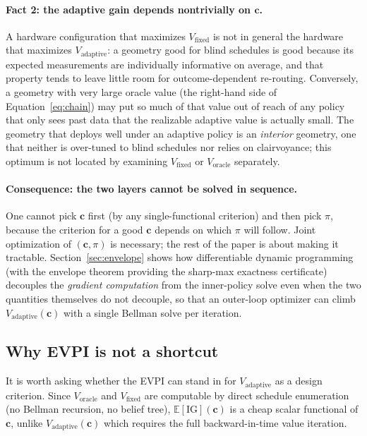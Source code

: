 \documentclass[11pt,a4paper,onecolumn]{article}
\newcommand{\E}{\mathbb{E}}
\newcommand{\bc}{\bm{c}}
\begin{document}
\paragraph{Fact 2: the adaptive gain depends nontrivially on $\bc$.}  A hardware configuration that maximizes $V_{\text{fixed}}$ is not in general the hardware that maximizes $V_{\text{adaptive}}$: a geometry good for blind schedules is good because its expected measurements are individually informative on average, and that property tends to leave little room for outcome-dependent re-routing.  Conversely, a geometry with very large oracle value (the right-hand side of Equation~\eqref{eq:chain}) may put so much of that value out of reach of any policy that only sees past data that the realizable adaptive value is actually small.  The geometry that deploys well under an adaptive policy is an \emph{interior} geometry, one that neither is over-tuned to blind schedules nor relies on clairvoyance; this optimum is not located by examining $V_{\text{fixed}}$ or $V_{\text{oracle}}$ separately.

\paragraph{Consequence: the two layers cannot be solved in sequence.}  One cannot pick $\bc$ first (by any single-functional criterion) and then pick $\pi$, because the criterion for a good $\bc$ depends on which $\pi$ will follow.  Joint optimization of $(\bc, \pi)$ is necessary; the rest of the paper is about making it tractable.  Section~\ref{sec:envelope} shows how differentiable dynamic programming (with the envelope theorem providing the sharp-max exactness certificate) decouples the \emph{gradient computation} from the inner-policy solve even when the two quantities themselves do not decouple, so that an outer-loop optimizer can climb $V_{\text{adaptive}}(\bc)$ with a single Bellman solve per iteration.

\subsection{Why EVPI is not a shortcut}
\label{sec:evpi_shortcut}

It is worth asking whether the EVPI can stand in for $V_{\text{adaptive}}$ as a design criterion.  Since $V_{\text{oracle}}$ and $V_{\text{fixed}}$ are computable by direct schedule enumeration (no Bellman recursion, no belief tree), $\E[\mathrm{IG}](\bc)$ is a cheap scalar functional of $\bc$, unlike $V_{\text{adaptive}}(\bc)$ which requires the full backward-in-time value iteration.
\end{document}
